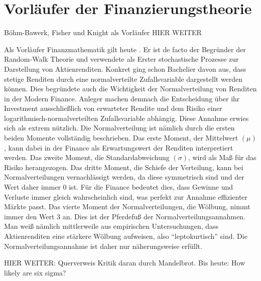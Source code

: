\section{Vorläufer der Finanzierungstheorie}
\label{FisherundKnight}




Böhm-Bawerk, Fisher und Knight als Vorläufer
HIER WEITER

Als Vorläufer Finanzmathematik gilt heute \textcite{Bachelier1900}. Er ist de facto der Begründer der Random-Walk Theorie und verwendete als Erster stochastische Prozesse zur Darstellung von Aktienrenditen. Konkret ging schon Bachelier davon aus, dass stetige Renditen durch eine normalverteilte Zufallsvariable dargestellt werden können. Dies begründete auch die Wichtigkeit der Normalverteilung von Renditen in der Modern Finance. Anleger machen demnach die Entscheidung über ihr Investment ausschließlich von erwarteter Rendite und dem Risiko einer logarithmisch-normalverteilten Zufallsvariable abhängig. Diese Annahme erwies sich als extrem nützlich. Die Normalverteilung ist nämlich durch die ersten beiden Momente vollständig beschrieben. Das erste Moment, der Mittelwert $(\mu)$, kann dabei in der Finance als Erwartungswert der Renditen interpretiert werden. Das zweite Moment, die Standardabweichung $(\sigma)$, wird als Maß für das Risiko herangezogen. Das dritte Moment, die Schiefe der Verteilung, kann bei Normalverteilungen vernachlässigt werden, da diese symmetrisch sind und der Wert daher immer 0 ist. Für die Finance bedeutet dies, dass Gewinne und Verluste immer gleich wahrscheinlich sind, was perfekt zur Annahme effizienter Märkte passt. Das vierte Moment der Normalverteilungen, die Wölbung, nimmt immer den Wert 3 an. Dies ist der Pferdefuß der Normalverteilungsannahmen. Man weiß nämlich mittlerweile aus empirischen Untersuchungen, dass Aktienrenditen eine stärkere Wölbung aufweisen, also "`leptokurtisch"' sind. Die Normalverteilungsannahme ist daher nur näherungsweise erfüllt. 


HIER WEITER: Querverweis Kritik daran durch Mandelbrot. Bis heute: How likely are six sigma?


